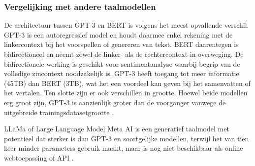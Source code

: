 

\subsubsection{Vergelijking met andere taalmodellen}

De architectuur tussen GPT-3 en BERT is volgens \textcite{Mottesi2023} het meest opvallende verschil. GPT-3 is een autoregressief model en houdt daarmee enkel rekening met de linkercontext bij het voorspellen of genereren van tekst. BERT daarentegen is bidirectioneel en neemt zowel de linker- als de rechtercontext in overweging. De bidirectionele werking is geschikt voor sentimentanalyse waarbij begrip van de volledige zincontext noodzakelijk is. GPT-3 heeft toegang tot meer informatie (45TB) dan BERT (3TB), wat het een voordeel kan geven bij het samenvatten of het vertalen. Ten slotte zijn er ook verschillen in grootte. Hoewel beide modellen erg groot zijn, GPT-3 is aanzienlijk groter dan de voorganger vanwege de uitgebreide trainingsdatasetgrootte \autocite{Brown2020}.

LLaMa of Large Language Model Meta AI is een generatief taalmodel met potentieel dat sterker is dan GPT-3 en soortgelijke modellen, terwijl het van tien keer minder parameters gebruik maakt, maar is nog niet beschikbaar als online webtoepassing of API \autocite{Hern2023, Touvron2023}.



